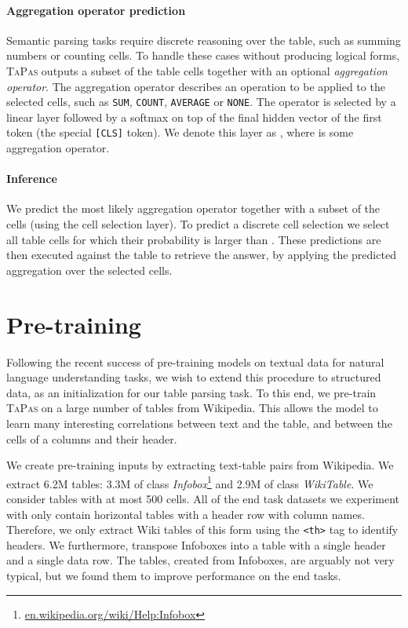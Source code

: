 \documentclass[11pt,a4paper]{article}
\newcommand{\ours}{\textsc{TaPas}\xspace}
\begin{document}
\paragraph{Aggregation operator prediction}
Semantic parsing tasks require discrete reasoning over the table, such as summing numbers or counting cells. To handle these cases without producing logical forms, \ours outputs a subset of the table cells together with an optional \textit{aggregation operator}. The aggregation operator describes an operation to be applied to the selected cells, such as \texttt{SUM}, \texttt{COUNT}, \texttt{AVERAGE} or \texttt{NONE}. The operator is selected by a linear layer followed by a softmax on top of the final hidden vector of the first token (the special \texttt{[CLS]} token). We denote this layer as , where  is some aggregation operator.

\paragraph{Inference} We predict the most likely aggregation operator together with a subset of the cells (using the cell selection layer).
To predict a discrete cell selection we select all table cells for which their probability is larger than .
These predictions are then executed against the table to retrieve the answer, by applying the predicted aggregation over the selected cells.
 \section{Pre-training}
\label{sec:pre_training}

Following the recent success of pre-training models on textual data for natural language understanding tasks, we wish to extend this procedure to structured data, as an initialization for our table parsing task. To this end, we pre-train \ours on a large number of tables from Wikipedia. 
This allows the model to learn many interesting correlations between text and the table, and between the cells of a columns and their header.

We create pre-training inputs by extracting text-table pairs from Wikipedia.
We extract 6.2M tables: 3.3M of class \emph{Infobox}\footnote{\url{en.wikipedia.org/wiki/Help:Infobox}} and 2.9M of class \emph{WikiTable}.
We consider tables with at most 500 cells.
All of the end task datasets we experiment with only contain horizontal tables with a header row with column names. 
Therefore, we only extract Wiki tables of this form using the \texttt{<th>} tag to identify headers. We furthermore, transpose Infoboxes into a table with a single header and a single data row.
The tables, created from Infoboxes, are arguably not very typical, but we found them to improve performance on the end tasks.
\end{document}
